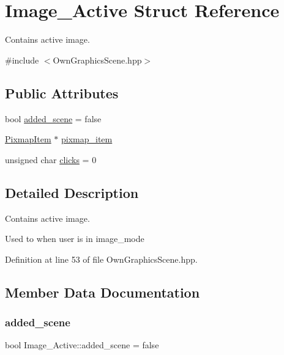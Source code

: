\hypertarget{structImage__Active}{}\section{Image\+\_\+\+Active Struct Reference}
\label{structImage__Active}


Contains active image.  




{\ttfamily \#include $<$Own\+Graphics\+Scene.\+hpp$>$}

\subsection*{Public Attributes}
\begin{DoxyCompactItemize}
\item 
bool \mbox{\hyperlink{structImage__Active_ac5eb10f5ca4ad81766c92a6ede6f7853}{added\+\_\+scene}} = false
\item 
\mbox{\hyperlink{classPixmapItem}{Pixmap\+Item}} $\ast$ \mbox{\hyperlink{structImage__Active_aa007ea3c9ba4830bbc2706af51820c20}{pixmap\+\_\+item}}
\item 
unsigned char \mbox{\hyperlink{structImage__Active_abb039226daf0372a8d88c842f5eb140f}{clicks}} = 0
\end{DoxyCompactItemize}


\subsection{Detailed Description}
Contains active image. 

Used to when user is in image\+\_\+mode 

Definition at line 53 of file Own\+Graphics\+Scene.\+hpp.



\subsection{Member Data Documentation}
\mbox{\label{structImage__Active_ac5eb10f5ca4ad81766c92a6ede6f7853}} 
\subsubsection{\texorpdfstring{added\+\_\+scene}{added\_scene}}
{\footnotesize\ttfamily bool Image\+\_\+\+Active\+::added\+\_\+scene = false}

